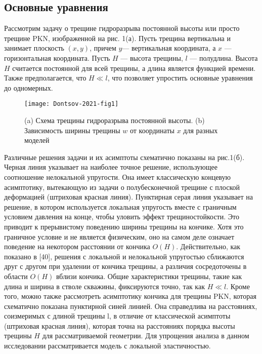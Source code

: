 \documentclass[main.tex]{subfiles}
\begin{document}
\subsection{Основные уравнения}

Рассмотрим задачу о трещине гидроразрыва постоянной высоты или просто трещине PKN, изображенной на рис. 1(а).
Пусть трещина вертикальна и занимает плоскость $(x, y)$, причем $y$— вертикальная координата, а $x$ — горизонтальная координата.
Пусть $H$ — высота трещины, $l$ — полудлина.
Высота $H$ считается постоянной для всей трещины, а длина является функцией времени.
Также предполагается, что $H\ll l$, что позволяет упростить основные уравнения до одномерных.

\begin{figure}[H]
\center
\texttt{[image: Dontsov-2021-fig1]}
\vspace*{-10mm}
\caption{(a) Схема трещины гидроразрыва постоянной высоты. (b) Зависимость ширины трещины $w$ от координаты $x$ для разных моделей}
\label{fig:Dontsov-2021-fig1}
\end{figure}

Различные решения задачи и их асимптоты схематично показаны на рис.1(б).
Черная линия указывает на наиболее точное решение, использующее соотношение нелокальной упругости.
Она имеет классическую концевую асимптотику, вытекающую из задачи о полубесконечной трещине с плоской деформацией (штриховая красная линия).
Пунктирная серая линия указывает на решение, в котором используется локальная упругость вместе с граничным условием давления на конце, чтобы уловить эффект трещиностойкости.
Это приводит к прерывистому поведению ширины трещины на кончике.
Хотя это граничное условие и не является физическим, оно на самом деле означает поведение на некотором расстоянии от кончика $O(H)$.
Действительно, как показано в [40], решения с локальной и нелокальной упругостью сближаются друг с другом при удалении от кончика трещины, а различия сосредоточены в области $O(H)$ вблизи кончика.
Общие характеристики трещины, такие как длина и ширина в стволе скважины, фиксируются точно, так как $H\ll l$.
Кроме того, можно также рассмотреть асимптотику кончика для трещины PKN, которая схематично показана пунктирной синей линией.
Она справедлива на расстояниях, соизмеримых с длиной трещины l, в отличие от классической асимптоты (штриховая красная линия), которая точна на расстояниях порядка высоты трещины $H$ для рассматриваемой геометрии.
Для упрощения анализа в данном исследовании рассматривается модель с локальной эластичностью.
\end{document}
